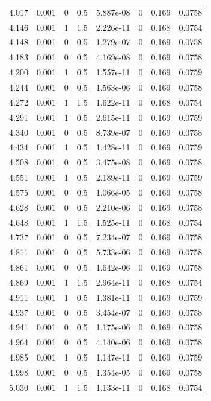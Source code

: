 \documentclass[preview]{standalone}
\begin{document}
{{{\begin{tabular}{L{1.2cm}C{1.2cm} C{0.3cm}C{0.5cm} C{1.4cm}C{1.4cm} C{1.4cm}C{1.4cm}}
  4.017  &  0.001  & 0     & 0.5 &  5.887e-08  & 0  & 0.169 &  0.0758   \\ 
  4.146  &  0.001  & 1     & 1.5 &  2.226e-11  & 0  & 0.168 &  0.0754   \\ 
  4.148  &  0.001  & 0     & 0.5 &  1.279e-07  & 0  & 0.169 &  0.0758   \\ 
  4.183  &  0.001  & 0     & 0.5 &  4.169e-08  & 0  & 0.169 &  0.0758   \\ 
  4.200  &  0.001  & 1     & 0.5 &  1.557e-11  & 0  & 0.169 &  0.0759   \\ 
  4.244  &  0.001  & 0     & 0.5 &  1.563e-06  & 0  & 0.169 &  0.0758   \\ 
  4.272  &  0.001  & 1     & 1.5 &  1.622e-11  & 0  & 0.168 &  0.0754   \\ 
  4.291  &  0.001  & 1     & 0.5 &  2.615e-11  & 0  & 0.169 &  0.0759   \\ 
  4.340  &  0.001  & 0     & 0.5 &  8.739e-07  & 0  & 0.169 &  0.0758   \\ 
  4.434  &  0.001  & 1     & 0.5 &  1.428e-11  & 0  & 0.169 &  0.0759   \\ 
  4.508  &  0.001  & 0     & 0.5 &  3.475e-08  & 0  & 0.169 &  0.0758   \\ 
  4.551  &  0.001  & 1     & 0.5 &  2.189e-11  & 0  & 0.169 &  0.0759   \\ 
  4.575  &  0.001  & 0     & 0.5 &  1.066e-05  & 0  & 0.169 &  0.0758   \\ 
  4.628  &  0.001  & 0     & 0.5 &  2.210e-06  & 0  & 0.169 &  0.0758   \\ 
  4.648  &  0.001  & 1     & 1.5 &  1.525e-11  & 0  & 0.168 &  0.0754   \\ 
  4.737  &  0.001  & 0     & 0.5 &  7.234e-07  & 0  & 0.169 &  0.0758   \\ 
  4.811  &  0.001  & 0     & 0.5 &  5.733e-06  & 0  & 0.169 &  0.0758   \\ 
  4.861  &  0.001  & 0     & 0.5 &  1.642e-06  & 0  & 0.169 &  0.0758   \\ 
  4.869  &  0.001  & 1     & 1.5 &  2.964e-11  & 0  & 0.168 &  0.0754   \\ 
  4.911  &  0.001  & 1     & 0.5 &  1.381e-11  & 0  & 0.169 &  0.0759   \\ 
  4.937  &  0.001  & 0     & 0.5 &  3.454e-07  & 0  & 0.169 &  0.0758   \\ 
  4.941  &  0.001  & 0     & 0.5 &  1.175e-06  & 0  & 0.169 &  0.0758   \\ 
  4.964  &  0.001  & 0     & 0.5 &  4.140e-06  & 0  & 0.169 &  0.0758   \\ 
  4.985  &  0.001  & 1     & 0.5 &  1.147e-11  & 0  & 0.169 &  0.0759   \\ 
  4.998  &  0.001  & 0     & 0.5 &  1.354e-05  & 0  & 0.169 &  0.0758   \\ 
  5.030  &  0.001  & 1     & 1.5 &  1.133e-11  & 0  & 0.168 &  0.0754   \\ 
\hline 
\end{tabular} 

}}}
\end{document}
